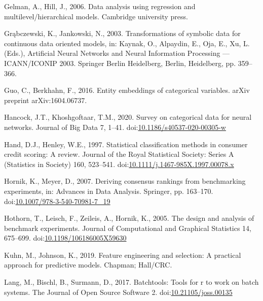 \documentclass[smallextended]{svjour3}       %
\newlength{\cslhangindent}
\newlength{\cslentryspacingunit} %
\newenvironment{CSLReferences}[2] %
 {%
  \setlength{\parindent}{0pt}
  \ifodd #1
  \let\oldpar\par
  \def\par{\hangindent=\cslhangindent\oldpar}
  \fi
  \setlength{\parskip}{#2\cslentryspacingunit}
 }%
 {}
\begin{document}
\begin{CSLReferences}{1}{0}
\leavevmode{}%
Gelman, A., Hill, J., 2006. Data analysis using regression and multilevel/hierarchical models. Cambridge university press.

\leavevmode{}%
Grąbczewski, K., Jankowski, N., 2003. Transformations of symbolic data for continuous data oriented models, in: Kaynak, O., Alpaydin, E., Oja, E., Xu, L. (Eds.), Artificial Neural Networks and Neural Information Processing --- ICANN/ICONIP 2003. Springer Berlin Heidelberg, Berlin, Heidelberg, pp. 359--366.

\leavevmode{}%
Guo, C., Berkhahn, F., 2016. Entity embeddings of categorical variables. arXiv preprint arXiv:1604.06737.

\leavevmode{}%
Hancock, J.T., Khoshgoftaar, T.M., 2020. Survey on categorical data for neural networks. Journal of Big Data 7, 1--41. doi:\href{https://doi.org/10.1186/s40537-020-00305-w}{10.1186/s40537-020-00305-w}

\leavevmode{}%
Hand, D.J., Henley, W.E., 1997. Statistical classification methods in consumer credit scoring: A review. Journal of the Royal Statistical Society: Series A (Statistics in Society) 160, 523--541. doi:\href{https://doi.org/10.1111/j.1467-985X.1997.00078.x}{10.1111/j.1467-985X.1997.00078.x}

\leavevmode{}%
Hornik, K., Meyer, D., 2007. Deriving consensus rankings from benchmarking experiments, in: Advances in Data Analysis. Springer, pp. 163--170. doi:\href{https://doi.org/10.1007/978-3-540-70981-7_19}{10.1007/978-3-540-70981-7\_19}

\leavevmode{}%
Hothorn, T., Leisch, F., Zeileis, A., Hornik, K., 2005. The design and analysis of benchmark experiments. Journal of Computational and Graphical Statistics 14, 675--699. doi:\href{https://doi.org/10.1198/106186005X59630}{10.1198/106186005X59630}

\leavevmode{}%
Kuhn, M., Johnson, K., 2019. Feature engineering and selection: A practical approach for predictive models. Chapman; Hall/CRC.

\leavevmode{}%
Lang, M., Bischl, B., Surmann, D., 2017. Batchtools: Tools for r to work on batch systems. The Journal of Open Source Software 2. doi:\href{https://doi.org/10.21105/joss.00135}{10.21105/joss.00135}


\end{CSLReferences}
\end{document}
